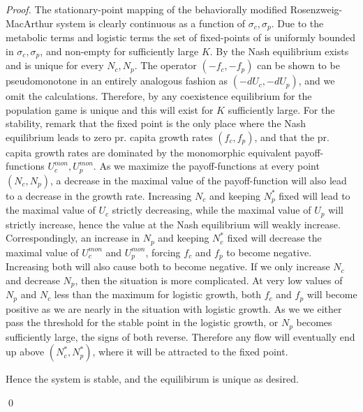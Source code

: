 \begin{proof}
The stationary-point mapping of the behaviorally modified Rosenzweig-MacArthur system is clearly continuous as a function of $\sigma_c,\sigma_p$. Due to the metabolic terms and logistic terms the set of fixed-points of is uniformly bounded in $\sigma_c, \sigma_p$, and non-empty for sufficiently large $K$. By  the Nash equilibrium exists and is unique for every $N_c, N_p$. The operator $(-f_c, -f_p)$ can be shown to be pseudomonotone in an entirely analogous fashion as $(-dU_c, -dU_p)$, and we omit the calculations. Therefore, by  any coexistence equilibrium for the population game is unique and this will exist for $K$ sufficiently large.
For the stability, remark that the fixed point is the only place where the Nash equilibrium leads to zero pr. capita growth rates $(f_c, f_p)$, and that the pr. capita growth rates are dominated by the monomorphic equivalent payoff-functions $U_c^{mon}, U_p^{mon}$. As we maximize the payoff-functions at every point $(N_c,N_p)$, a decrease in the maximal value of the payoff-function will also lead to a decrease in the growth rate.
Increasing $N_c$ and keeping $N_p^*$ fixed will lead to the maximal value of $U_c$ strictly decreasing, while the maximal value of $U_p$ will strictly increase, hence the value at the Nash equilibrium will weakly increase. Correspondingly, an increase in $N_p$ and keeping $N_c^*$ fixed will decrease the maximal value of $U_c^{mon}$ and $U_p^{mon}$, forcing $f_c$ and $f_p$ to become negative. Increasing both will also cause both to become negative. If we only increase $N_c$ and decrease $N_p$, then the situation is more complicated. At very low values of $N_p$ and $N_c$ less than the maximum for logistic growth, both $f_c$ and $f_p$ will become positive as we are nearly in the situation with logistic growth. As we we either pass the threshold for the stable point in the logistic growth, or $N_p$ becomes sufficiently large, the signs of both reverse.
Therefore any flow will eventually end up above $(N_c^*,N_p^*)$, where it will be attracted to the fixed point.

Hence the system is stable, and the equilibirum is unique as desired.

\qed
\end{proof}

